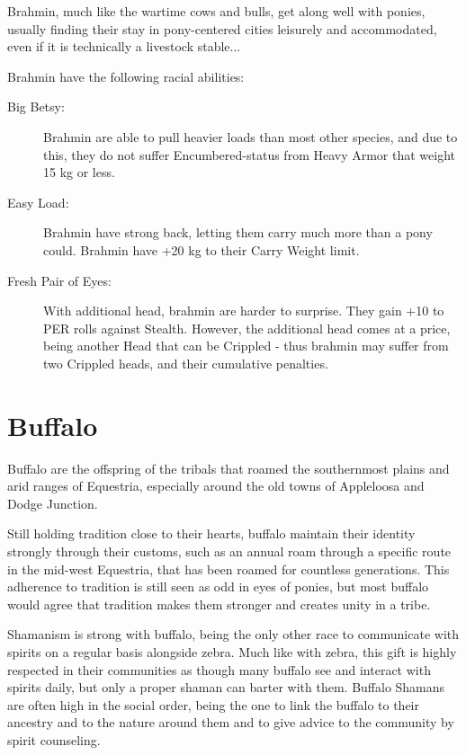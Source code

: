 \documentclass[11pt,a4paper,twocolumn]{book}
\begin{document}
	Brahmin, much like the wartime cows and bulls, get along well with ponies, usually finding their stay in pony-centered cities leisurely and accommodated, even if it is technically a livestock stable...
	
	Brahmin have the following racial abilities:
	\begin{description}
		\item[Big Betsy:] Brahmin are able to pull heavier loads than most other species, and due to this, they do not suffer Encumbered-status from Heavy Armor that weight 15 kg or less.
		\item[Easy Load:] Brahmin have strong back, letting them carry much more than a pony could. Brahmin have +20 kg to their Carry Weight limit.
		\item[Fresh Pair of Eyes:] With additional head, brahmin are harder to surprise. They gain +10 to PER rolls against Stealth. However, the additional head comes at a price, being another Head that can be Crippled - thus brahmin may suffer from two Crippled heads, and their cumulative penalties.
	\end{description}
   
   	\clearpage
   	
   	\section*{Buffalo}
   
  	 Buffalo are the offspring of the tribals that roamed the southernmost plains and arid ranges of Equestria, especially around the old towns of Appleloosa and Dodge Junction. 
   
  	 Still holding tradition close to their hearts, buffalo maintain their identity strongly through their customs, such as an annual roam through a specific route in the mid-west Equestria, that has been roamed for countless generations. This adherence to tradition is still seen as odd in eyes of ponies, but most buffalo would agree that tradition makes them stronger and creates unity in a tribe.
   
   	Shamanism is strong with buffalo, being the only other race to communicate with spirits on a regular basis alongside zebra. Much like with zebra, this gift is highly respected in their communities as though many buffalo see and interact with spirits daily, but only a proper shaman can barter with them. Buffalo Shamans are often high in the social order, being the one to link the buffalo to their ancestry and to the nature around them and to give advice to the community by spirit counseling.
   
\end{document}
